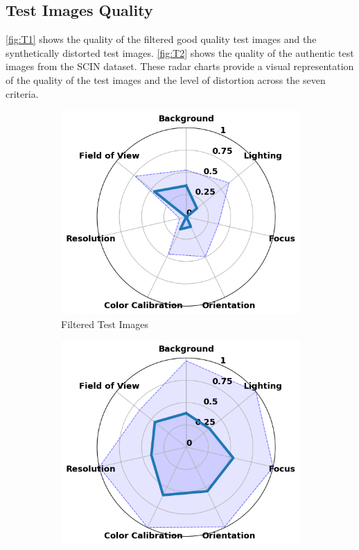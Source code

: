 \subsection{Test Images Quality}
\label{subsec:TestImagesQuality}
\autoref{fig:T1} shows the quality of the filtered good quality test images and the synthetically distorted test images. \autoref{fig:T2} shows the quality of the authentic test images from the SCIN dataset. These radar charts provide a visual representation of the quality of the test images and the level of distortion across the seven criteria. \par
\begin{figure}[ht]
    \centering
    \begin{subfigure}[b]{0.48\textwidth}
        \includegraphics[width=\textwidth]{img/hept/test_70.png}
        \caption{Filtered Test Images}
        \label{fig:test_70}
    \end{subfigure}
    \hfill
    \begin{subfigure}[b]{0.48\textwidth}
        \includegraphics[width=\textwidth]{img/hept/test_70_synthetic.png}

\end{subfigure}
\end{figure}
